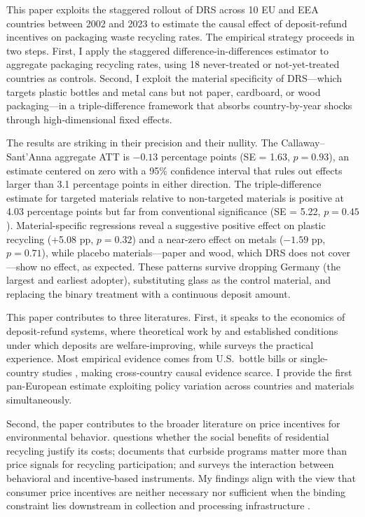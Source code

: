 \documentclass[12pt]{article}
\begin{document}
This paper exploits the staggered rollout of DRS across 10 EU and EEA countries between 2002 and 2023 to estimate the causal effect of deposit-refund incentives on packaging waste recycling rates. The empirical strategy proceeds in two steps. First, I apply the \citet{callaway2021difference} staggered difference-in-differences estimator to aggregate packaging recycling rates, using 18 never-treated or not-yet-treated countries as controls. Second, I exploit the material specificity of DRS---which targets plastic bottles and metal cans but not paper, cardboard, or wood packaging---in a triple-difference framework that absorbs country-by-year shocks through high-dimensional fixed effects.

The results are striking in their precision and their nullity. The Callaway--Sant'Anna aggregate ATT is $-0.13$ percentage points (SE = 1.63, $p = 0.93$), an estimate centered on zero with a 95\% confidence interval that rules out effects larger than 3.1 percentage points in either direction. The triple-difference estimate for targeted materials relative to non-targeted materials is positive at 4.03 percentage points but far from conventional significance (SE = 5.22, $p = 0.45$). Material-specific regressions reveal a suggestive positive effect on plastic recycling (+5.08 pp, $p = 0.32$) and a near-zero effect on metals ($-1.59$ pp, $p = 0.71$), while placebo materials---paper and wood, which DRS does not cover---show no effect, as expected. These patterns survive dropping Germany (the largest and earliest adopter), substituting glass as the control material, and replacing the binary treatment with a continuous deposit amount.

This paper contributes to three literatures. First, it speaks to the economics of deposit-refund systems, where theoretical work by \citet{palmerWalls1997} and \citet{fullerton2005two} established conditions under which deposits are welfare-improving, while \citet{walls2011deposit} surveys the practical experience. Most empirical evidence comes from U.S.\ bottle bills \citep{beatty2007optimal, ashenmiller2009cash} or single-country studies \citep{bohm2022deposit, linderhof2001addressing}, making cross-country causal evidence scarce. I provide the first pan-European estimate exploiting policy variation across countries and materials simultaneously.

Second, the paper contributes to the broader literature on price incentives for environmental behavior. \citet{kinnaman2006policy} questions whether the social benefits of residential recycling justify its costs; \citet{jenkins2003price} documents that curbside programs matter more than price signals for recycling participation; and \citet{kirakozian2016household} surveys the interaction between behavioral and incentive-based instruments. My findings align with the view that consumer price incentives are neither necessary nor sufficient when the binding constraint lies downstream in collection and processing infrastructure \citep{oecd2016epr, oecd2022plasticpollution}.
\end{document}
